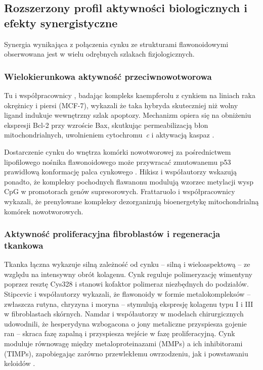 \documentclass[12pt,a4paper]{article}
\begin{document}
\subsection{Rozszerzony profil aktywności biologicznych i efekty synergistyczne}

Synergia wynikająca z połączenia cynku ze strukturami flawonoidowymi obserwowana jest w wielu odrębnych szlakach fizjologicznych.

\subsubsection{Wielokierunkowa aktywność przeciwnowotworowa}

Tu i współpracownicy \cite{tu2016}, badając kompleks kaempferolu z cynkiem na liniach raka okrężnicy i piersi (MCF-7), wykazali że taka hybryda skuteczniej niż wolny ligand indukuje wewnętrzny szlak apoptozy. Mechanizm opiera się na obniżeniu ekspresji Bcl-2 przy wzroście Bax, skutkując permeabilizacją błon mitochondrialnych, uwolnieniem cytochromu~\textit{c} i aktywacją kaspaz \cite{tu2016, golonko2024}.

Dostarczenie cynku do wnętrza komórki nowotworowej za pośrednictwem lipofilowego nośnika flawonoidowego może przywracać zmutowanemu p53 prawidłową konformację palca cynkowego \cite{chasapis2020}. Hikisz i współautorzy \cite{hikisz2024} wskazują ponadto, że kompleksy pochodnych flawanonu modulują wzorzec metylacji wysp CpG w promotorach genów supresorowych. Frattaruolo i współpracownicy \cite{frattaruolo2024} wykazali, że prenylowane kompleksy dezorganizują bioenergetykę mitochondrialną komórek nowotworowych.

\subsubsection{Aktywność proliferacyjna fibroblastów i regeneracja tkankowa}

Tkanka łączna wykazuje silną zależność od cynku -- silną i wieloaspektową -- ze względu na intensywny obrót kolagenu. Cynk reguluje polimeryzację wimentyny poprzez resztę Cys328 i stanowi kofaktor polimeraz niezbędnych do podziałów. Stipcevic i współautorzy \cite{stipcevic2006} wykazali, że flawonoidy w formie metalokompleksów -- zwłaszcza rutyna, chryzyna i moryna -- stymulują ekspresję kolagenu typu I i III w fibroblastach skórnych. Namdar i współautorzy \cite{namdar2025} w modelach chirurgicznych udowodnili, że hesperydyna wzbogacona o jony metaliczne przyspiesza gojenie ran -- skraca fazę zapalną i przyspiesza wejście w fazę proliferacyjną. Cynk moduluje równowagę między metaloproteinazami (MMPs) a ich inhibitorami (TIMPs), zapobiegając zarówno przewlekłemu owrzodzeniu, jak i powstawaniu keloidów \cite{wessels2012}.
\end{document}
